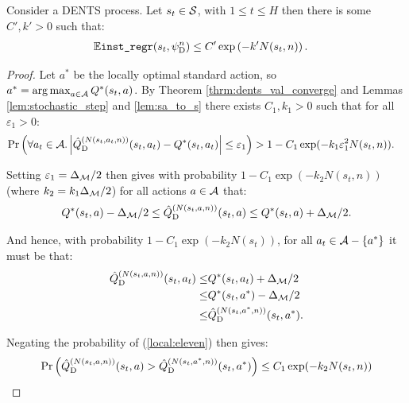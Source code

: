     \begin{lemma} \label{lem:dents_imm_simple_regret}
        Consider a DENTS process. Let $s_t\in\mathcal{S}$, with $1\leq t \leq H$  then there is some $C',k'>0$ such that:
        \begin{align}
            \mathbb{E} {\textnormal{\texttt{inst\_regr}}}(s_{t},{\psi^{n}_{{\textnormal{D}}}}) &\leq C'\exp\left( -k' N(s_{t},n) \right).
        \end{align}
    \end{lemma}
    \begin{proof}
        Let $a^*$ be the locally optimal standard action, so $a^*=\operatorname*{arg\,max}_{a\in\mathcal{A}} Q^*(s_t,a)$. By Theorem \ref{thrm:dents_val_converge} and Lemmas \ref{lem:stochastic_step} and \ref{lem:sa_to_s} there exists $C_1,k_1>0$ such that for all $\varepsilon_1>0$:
        \begin{align}
            \Pr\left(\forall a_t\in\mathcal{A}. \left|{\hat{Q}^{(N(s_t,a_t,n))}_{{\textnormal{D}}}}(s_t,a_t)-Q^*(s_t,a_t)\right|\leq \varepsilon_1\right) &> 1-C_1 \exp(-k_1 \varepsilon_1^2 N(s_t,n)).
        \end{align}
        
        Setting $\varepsilon_1=\Delta_{\mathcal{M}}/2$ then gives with probability $1-C_1 \exp(-k_2N(s_t,n))$ (where $k_2=k_1\Delta_{\mathcal{M}}/2$) for all actions $a\in\mathcal{A}$ that:
        \begin{align}
            Q^*(s_t,a) - \Delta_{\mathcal{M}}/2 \leq {\hat{Q}^{(N(s_t,a,n))}_{{\textnormal{D}}}}(s_t,a) \leq Q^*(s_t,a) + \Delta_{\mathcal{M}}/2.
        \end{align}
        
        And hence, with probability $1-C_1 \exp(-k_2N(s_t))$, for all $a_t\in\mathcal{A}-\{a^*\}$ it must be that:
        \begin{align}
            {\hat{Q}^{(N(s_t,a,n))}_{{\textnormal{D}}}}(s_t,a_t)
                \leq& Q^*(s_t,a_t) + \Delta_{\mathcal{M}}/2 \\
                \leq& Q^*(s_t,a^*) - \Delta_{\mathcal{M}}/2 \\
                \leq& {\hat{Q}^{(N(s_t,a^*,n))}_{{\textnormal{D}}}}(s_t,a^*). \label{local:eleven}
        \end{align}
        
        Negating the probability of (\ref{local:eleven}) then gives:
        \begin{align}
            \Pr\left({\hat{Q}^{(N(s_t,a,n))}_{{\textnormal{D}}}}(s_t,a) > {\hat{Q}^{(N(s_t,a^*,n))}_{{\textnormal{D}}}}(s_t,a^*)\right) \leq C_1 \exp(-k_2N(s_t,n))
        \end{align}
        

\end{proof}
